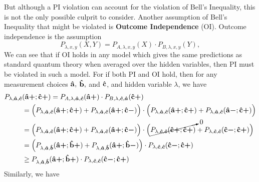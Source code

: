 But although a PI violation can account for the violation of Bell's Inequality, this is not the only possible culprit to consider. Another assumption of Bell's Inequality that might be violated is \textbf{Outcome Independence} (OI). Outcome independence is the assumption
\begin{equation}\label{OI}
P_{\lambda,x,y}(X,Y)=P_{A,\lambda,x,y}(X)\cdot P_{B,\lambda,x,y}(Y),
\end{equation}
We can see that if OI holds in any model which gives the same predictions as standard quantum theory when averaged over the hidden variables, then PI must be violated in such a model. For if both PI and OI hold, then for any measurement choices $\vb{\hat{a}},$ $\vb{\hat{b}},$ and $\vb{\hat{c}}$, and hidden variable $\lambda$, we have
\begin{equation}\label{OIPI1}
\begin{split}
 P_{\lambda,\bm{\hat{a}},\bm{\hat{c}}}&(\vb{\hat{{a}}}\bm{+};\vb{\hat{{c}}}\bm{+})=P_{A,\lambda,\bm{\hat{a}},\bm{\hat{c}}}(\vb{\hat{{a}}}\bm{+})\cdot P_{B,\lambda,\bm{\hat{c}},\bm{\hat{a}}}(\vb{\hat{{c}}}\bm{+})\\
 &= \Big( P_{\lambda,\bm{\hat{a}},\bm{\hat{c}}}(\vb{\hat{{a}}}\bm{+};\vb{\hat{{c}}}\bm{+})+ P_{\lambda,\bm{\hat{a}},\bm{\hat{c}}}(\vb{\hat{{a}}}\bm{+};\vb{\hat{{c}}}\bm{-})\Big)\cdot\Big( P_{\lambda,\bm{\hat{a}},\bm{\hat{c}}}(\vb{\hat{{a}}}\bm{+};\vb{\hat{{c}}}\bm{+})+ P_{\lambda,\bm{\hat{a}},\bm{\hat{c}}}(\vb{\hat{{a}}}\bm{-};\vb{\hat{{c}}}\bm{+})\Big)\\
 &= \Big( P_{\lambda,\bm{\hat{a}},\bm{\hat{c}}}(\vb{\hat{{a}}}\bm{+};\vb{\hat{{c}}}\bm{+})+ P_{\lambda,\bm{\hat{a}},\bm{\hat{c}}}(\vb{\hat{{a}}}\bm{+};\vb{\hat{{c}}}\bm{-})\Big)\cdot\Big( \cancelto{0}{P_{\lambda,\bm{\hat{c}},\bm{\hat{c}}}(\vb{\hat{{c}}}\bm{+};\vb{\hat{{c}}}\bm{+})}+ P_{\lambda,\bm{\hat{c}},\bm{\hat{c}}}(\vb{\hat{{c}}}\bm{-};\vb{\hat{{c}}}\bm{+})\Big)\\
 &=\Big( P_{\lambda,\bm{\hat{a}},\bm{\hat{b}}}(\vb{\hat{{a}}}\bm{+};\vb{\hat{{b}}}\bm{+})+ P_{\lambda,\bm{\hat{a}},\bm{\hat{b}}}(\vb{\hat{{a}}}\bm{+};\vb{\hat{{b}}}\bm{-})\Big)\cdot P_{\lambda,\bm{\hat{c}},\bm{\hat{c}}}(\vb{\hat{{c}}}\bm{-};\vb{\hat{{c}}}\bm{+})\\
 &\geq P_{\lambda,\bm{\hat{a}},\bm{\hat{b}}}(\vb{\hat{{a}}}\bm{+};\vb{\hat{{b}}}\bm{+})\cdot P_{\lambda,\bm{\hat{c}},\bm{\hat{c}}}(\vb{\hat{{c}}}\bm{-};\vb{\hat{{c}}}\bm{+}) 
\end{split}
\end{equation}
Similarly, we have
